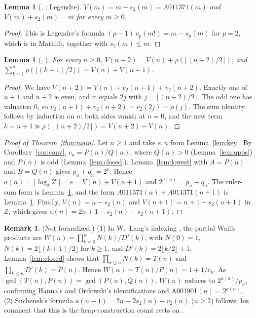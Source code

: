 \documentclass[11pt]{amsart}
\theoremstyle{plain}
\newtheorem{lemma}[theorem]{Lemma}
\theoremstyle{definition}
\newtheorem{remark}[theorem]{Remark}
\newcommand{\Z}{\mathbb{Z}}
\begin{document}
\begin{lemma}[, ; Legendre]\label{lem:legendre}
$V(m)=m-s_2(m)=A011371(m)$ and $V(m)+s_2(m)=m$ for every $m\ge0$.
\end{lemma}

\begin{proof}
This is Legendre's formula $(p-1)\,v_p(m!)=m-s_p(m)$ for $p=2$, which is  in Mathlib, together with $s_2(m)\le m$.
\end{proof}

\begin{lemma}[, ]\label{lem:ruler}
For every $n\ge0$, $V(n+2)=V(n)+\rho(\lfloor(n+2)/2\rfloor)$, and $\sum_{k=1}^{n}\rho(\lfloor(k+1)/2\rfloor)=V(n)+V(n+1)$.
\end{lemma}

\begin{proof}
We have $V(n+2)=V(n)+v_2(n+1)+v_2(n+2)$. Exactly one of $n+1$ and $n+2$ is even, and it equals $2j$ with $j=\lfloor(n+2)/2\rfloor$. The odd one has valuation $0$, so $v_2(n+1)+v_2(n+2)=v_2(2j)=\rho(j)$. The sum identity follows by induction on $n$: both sides vanish at $n=0$, and the new term $k=n+1$ is $\rho(\lfloor(n+2)/2\rfloor)=V(n+2)-V(n)$.
\end{proof}

\begin{proof}[Proof of Theorem~\ref{thm:main}]
Let $n\ge1$ and take $e,u$ from Lemma~\ref{lem:key}. By Corollary~\ref{cor:conv}, $c_n=P(n)/Q(n)$, where $Q(n)>0$ (Lemma~\ref{lem:qpos}) and $P(n)$ is odd (Lemma~\ref{lem:closed}). Lemma~\ref{lem:lowest} with $A=P(n)$ and $B=Q(n)$ gives $p_n+q_n=2^e$. Hence $a(n)=\lfloor\log_2 2^e\rfloor=e=V(n)+V(n+1)$ and $2^{a(n)}=p_n+q_n$. The ruler-sum form is Lemma~\ref{lem:ruler}, and the form $A011371(n)+A011371(n+1)$ is Lemma~\ref{lem:legendre}. Finally, $V(n)=n-s_2(n)$ and $V(n+1)=n+1-s_2(n+1)$ in $\Z$, which gives $a(n)=2n+1-s_2(n)-s_2(n+1)$.
\end{proof}

\begin{remark}\label{rem:wallis}
(Not formalized.) (1) In W.~Lang's indexing \cite{A001901}, the partial Wallis products are $W(n)=\prod_{k=0}^{n}N(k)/D'(k)$, with $N(0)=1$, $N(k)=2\lfloor(k+1)/2\rfloor$ for $k\ge1$, and $D'(k)=2\lfloor k/2\rfloor+1$. Lemma~\ref{lem:closed} shows that $\prod_{k\le n}N(k)=T(n)$ and $\prod_{k\le n}D'(k)=P(n)$. Hence $W(n)=T(n)/P(n)=1+1/c_n$. As $\gcd(T(n),P(n))=\gcd(P(n),Q(n))$, $W(n)$ reduces to $2^{a(n)}/p_n$, confirming Hanna's and Ordowski's identifications and A001901$(n)=2^{a(n)}$. (2) Suchenek's formula $a(n-1)=2n-2s_2(n)-v_2(n)$ ($n\ge2$) follows; his comment that this is the heap-construction count rests on \cite{Suchenek}.
\end{remark}
\end{document}
